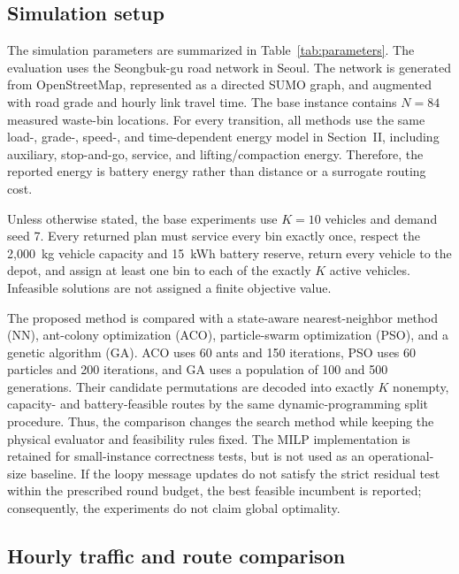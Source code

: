 \subsection{Simulation setup}

The simulation parameters are summarized in Table~\ref{tab:parameters}. The
evaluation uses the Seongbuk-gu road network in Seoul. The network is
generated from OpenStreetMap, represented as a directed SUMO graph, and
augmented with road grade and hourly link travel time. The base instance
contains $N=84$ measured waste-bin locations. For every transition, all
methods use the same load-, grade-, speed-, and time-dependent energy model in
Section~II, including auxiliary, stop-and-go, service, and
lifting/compaction energy. Therefore, the reported energy is battery energy
rather than distance or a surrogate routing cost.

Unless otherwise stated, the base experiments use $K=10$ vehicles and demand
seed 7. Every returned plan must service every bin exactly once, respect the
2,000~kg vehicle capacity and 15~kWh battery reserve, return every vehicle to
the depot, and assign at least one bin to each of the exactly $K$ active
vehicles. Infeasible solutions are not assigned a finite objective value.

The proposed method is compared with a state-aware nearest-neighbor method
(NN), ant-colony optimization (ACO), particle-swarm optimization (PSO), and a
genetic algorithm (GA). ACO uses 60 ants and 150 iterations, PSO uses 60
particles and 200 iterations, and GA uses a population of 100 and 500
generations. Their candidate permutations are decoded into exactly $K$
nonempty, capacity- and battery-feasible routes by the same dynamic-programming
split procedure. Thus, the comparison changes the search method while keeping
the physical evaluator and feasibility rules fixed. The MILP implementation
is retained for small-instance correctness tests, but is not used as an
operational-size baseline. If the loopy message updates do not satisfy the
strict residual test within the prescribed round budget, the best feasible
incumbent is reported; consequently, the experiments do not claim global
optimality.

\subsection{Hourly traffic and route comparison}

